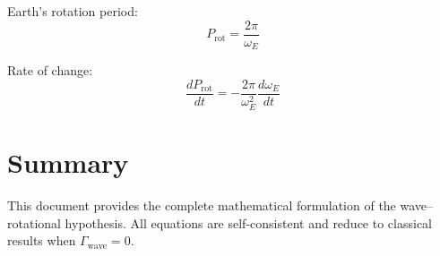 \documentclass[12pt,a4paper]{article}
\begin{document}
Earth's rotation period:
\begin{equation}
P_{\text{rot}} = \frac{2\pi}{\omega_E}
\label{eq:rotation_period}
\end{equation}

Rate of change:
\begin{equation}
\frac{dP_{\text{rot}}}{dt} = -\frac{2\pi}{\omega_E^2} \frac{d\omega_E}{dt}
\label{eq:LOD_change}
\end{equation}

\section{Summary}

This document provides the complete mathematical formulation of the wave–rotational hypothesis. All equations are self-consistent and reduce to classical results when $\Gamma_{\text{wave}} = 0$.
\end{document}
